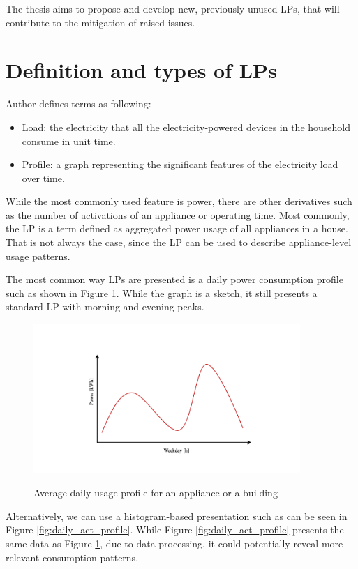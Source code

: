 The thesis aims to propose and develop new, previously unused LPs, that will contribute to the mitigation of raised issues.

\section{Definition and types of LPs}
\label{sec:LP_types}
Author \cite{Review2021} defines terms as following:

\begin{itemize}
	\item Load: the electricity that all the electricity-powered devices in the household consume in unit time.
	\item Profile: a graph representing the significant features of the electricity load over time.
\end{itemize}

While the most commonly used feature is power, there are other derivatives such as the number of activations of an appliance or operating time.
Most commonly, the LP is a term defined as aggregated power usage of all appliances in a house.
That is not always the case, since the LP can be used to describe appliance-level usage patterns. 

The most common way LPs are presented is a daily power consumption profile such as shown in Figure \ref{fig:daily_power_profile}. 
While the graph is a sketch, it still presents a standard LP with morning and evening peaks.

\begin{figure}[H]
	\centering
	\caption{Average daily usage profile for an appliance or a building}
	\includegraphics[width=0.9\textwidth]{Figures/profile_sketches/Slide1.png}
	\label{fig:daily_power_profile}
\end{figure}

Alternatively, we can use a histogram-based presentation such as can be seen in Figure \ref{fig:daily_act_profile}.
While Figure \ref{fig:daily_act_profile} presents the same data as Figure \ref{fig:daily_power_profile},
due to data processing, it could potentially reveal more relevant consumption patterns.


